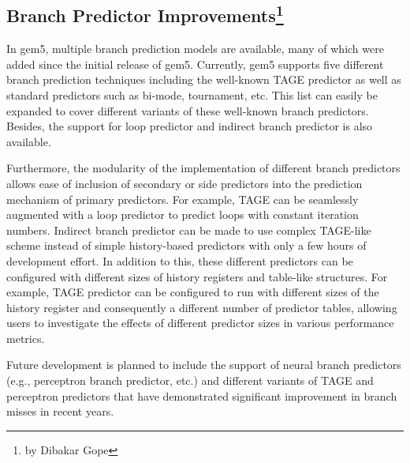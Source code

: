 \subsection[Branch Predictor Improvements]{Branch Predictor Improvements\footnote{by Dibakar Gope}}
\label{sec:predictor}

In gem5, multiple branch prediction models are available, many of which were added since the initial release of gem5.
Currently, gem5 supports five different branch prediction techniques including the well-known TAGE predictor as well as standard predictors such as bi-mode, tournament, etc.
This list can easily be expanded to cover different variants of these well-known branch predictors.
Besides, the support for loop predictor and indirect branch predictor is also available.

Furthermore, the modularity of the implementation of different branch predictors allows ease of inclusion of secondary or side predictors into the prediction mechanism of primary predictors.
For example, TAGE can be seamlessly augmented with a loop predictor to predict loops with constant iteration numbers.
Indirect branch predictor can be made to use complex TAGE-like scheme instead of simple history-based predictors with only a few hours of development effort.
In addition to this, these different predictors can be configured with different sizes of history registers and table-like structures.
For example, TAGE predictor can be configured to run with different sizes of the history register and consequently a different number of predictor tables, allowing users to investigate the effects of different predictor sizes in various performance metrics.

Future development is planned to include the support of neural branch predictors (e.g., perceptron branch predictor, etc.) and different variants of TAGE and perceptron predictors that have demonstrated significant improvement in branch misses in recent years.
